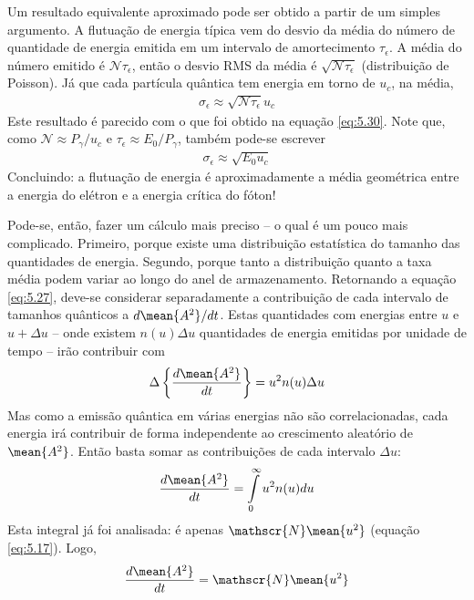 Um resultado equivalente aproximado pode ser obtido a partir de um simples argumento. A flutuação de energia típica vem do desvio da média do número de quantidade de energia emitida em um intervalo de amortecimento $\tau_\epsilon$. A média do número emitido é $\mathscr{N}\tau_\epsilon$, então o desvio RMS da média é $\sqrt{\mathscr{N}\tau_\epsilon}$ (distribuição de Poisson). Já que cada partícula quântica tem energia em torno de $u_c$, na média,
\begin{align}
	\sigma_\epsilon \approx \sqrt{\mathscr{N}\tau_\epsilon}u_c
\end{align}
Este resultado é parecido com o que foi obtido na equação \eqref{eq:5.30}. Note que, como $\mathscr{N} \approx P_\gamma/u_c$ e $\tau_\epsilon \approx E_0/P_\gamma$, também pode-se escrever
\begin{align}
	\sigma_\epsilon \approx \sqrt{E_0 u_c}
\end{align}
Concluindo: a flutuação de energia é aproximadamente a média geométrica entre a energia do elétron e a energia crítica do fóton!

Pode-se, então, fazer um cálculo mais preciso -- o qual é um pouco mais complicado. Primeiro, porque existe uma distribuição estatística do tamanho das quantidades de energia. Segundo, porque tanto a distribuição quanto a taxa média podem variar ao longo do anel de armazenamento. Retornando a equação \eqref{eq:5.27}, deve-se considerar separadamente a contribuição de cada intervalo de tamanhos quânticos a $d\mean{A^2}/dt$. Estas quantidades com energias entre $u$ e $u+\Delta u$ -- onde existem $n(u)\Delta u$ quantidades de energia emitidas por unidade de tempo -- irão contribuir com
\begin{align}
	\Delta \left\{\frac{d\mean{A^2}}{dt}\right\} = u^2 n(u) \Delta u
\end{align}
Mas como a emissão quântica em várias energias não são correlacionadas, cada energia irá contribuir de forma independente ao crescimento aleatório de $\mean{A^2}$. Então basta somar as contribuições de cada intervalo $\Delta u$:
\begin{align}
	\frac{d\mean{A^2}}{dt} = \int\limits_{0}^{\infty}u^2n(u)du
\end{align}
Esta integral já foi analisada: é apenas $\mathscr{N}\mean{u^2}$ (equação \eqref{eq:5.17}). Logo,
\begin{align}
	\frac{d\mean{A^2}}{dt} = \mathscr{N}\mean{u^2}
\end{align}

